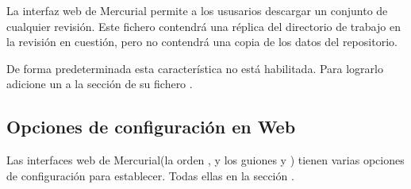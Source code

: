 La interfaz web de Mercurial permite a los ususarios descargar
un conjunto de cualquier revisión.  Este fichero contendrá una réplica
del directorio de trabajo en la revisión en cuestión, pero no
contendrá una copia de los datos del repositorio.

De forma predeterminada esta característica no está habilitada.  Para
lograrlo adicione un  a la sección 
de su fichero \hgrc.

\subsection{Opciones de configuración en Web}

Las interfaces web de Mercurial(la orden , y los guiones
 y ) tienen varias
opciones de configuración para establecer. Todas ellas en la sección
.
